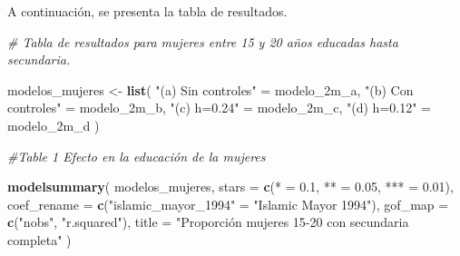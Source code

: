 \documentclass[
]{article}
\newenvironment{Shaded}{\begin{snugshade}}{\end{snugshade}}
\newcommand{\AttributeTok}[1]{\textcolor[rgb]{0.13,0.29,0.53}{#1}}
\newcommand{\CommentTok}[1]{\textcolor[rgb]{0.56,0.35,0.01}{\textit{#1}}}
\newcommand{\FloatTok}[1]{\textcolor[rgb]{0.00,0.00,0.81}{#1}}
\newcommand{\FunctionTok}[1]{\textcolor[rgb]{0.13,0.29,0.53}{\textbf{#1}}}
\newcommand{\NormalTok}[1]{#1}
\newcommand{\OtherTok}[1]{\textcolor[rgb]{0.56,0.35,0.01}{#1}}
\newcommand{\StringTok}[1]{\textcolor[rgb]{0.31,0.60,0.02}{#1}}
\begin{document}
A continuación, se presenta la tabla de resultados.

\begin{Shaded}
\begin{Highlighting}[]
\CommentTok{\# Tabla de resultados para mujeres entre 15 y 20 años educadas hasta secundaria.}

\NormalTok{modelos\_mujeres }\OtherTok{\textless{}{-}} \FunctionTok{list}\NormalTok{(}
  \StringTok{"(a) Sin controles"} \OtherTok{=}\NormalTok{ modelo\_2m\_a,}
  \StringTok{"(b) Con controles"} \OtherTok{=}\NormalTok{ modelo\_2m\_b,}
  \StringTok{"(c) h=0.24"} \OtherTok{=}\NormalTok{ modelo\_2m\_c,}
  \StringTok{"(d) h=0.12"} \OtherTok{=}\NormalTok{ modelo\_2m\_d}
\NormalTok{)}

\CommentTok{\#Table 1 Efecto en la educación de la mujeres}

\FunctionTok{modelsummary}\NormalTok{(}
\NormalTok{  modelos\_mujeres,}
  \AttributeTok{stars =} \FunctionTok{c}\NormalTok{(}\StringTok{\textquotesingle{}*\textquotesingle{}} \OtherTok{=} \FloatTok{0.1}\NormalTok{, }\StringTok{\textquotesingle{}**\textquotesingle{}} \OtherTok{=} \FloatTok{0.05}\NormalTok{, }\StringTok{\textquotesingle{}***\textquotesingle{}} \OtherTok{=} \FloatTok{0.01}\NormalTok{),}
  \AttributeTok{coef\_rename =} \FunctionTok{c}\NormalTok{(}\StringTok{"islamic\_mayor\_1994"} \OtherTok{=} \StringTok{"Islamic Mayor 1994"}\NormalTok{),}
  \AttributeTok{gof\_map =} \FunctionTok{c}\NormalTok{(}\StringTok{"nobs"}\NormalTok{, }\StringTok{"r.squared"}\NormalTok{),}
  \AttributeTok{title =} \StringTok{"Proporción mujeres 15{-}20 con secundaria completa"}
\NormalTok{)}
\end{Highlighting}
\end{Shaded}
\end{document}
